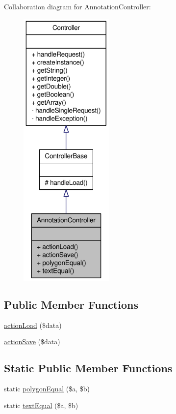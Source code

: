 Collaboration diagram for AnnotationController:\nopagebreak
\begin{figure}[H]
\begin{center}
\leavevmode
\includegraphics[height=400pt]{classAnnotationController__coll__graph}
\end{center}
\end{figure}
\subsection*{Public Member Functions}
\begin{DoxyCompactItemize}
\item 
\hyperlink{classAnnotationController_a228bd6bdd25685e7f87732eb18acb746}{actionLoad} (\$data)
\item 
\hyperlink{classAnnotationController_a94966419fbc178f74f0e6570c62af1a2}{actionSave} (\$data)
\end{DoxyCompactItemize}
\subsection*{Static Public Member Functions}
\begin{DoxyCompactItemize}
\item 
static \hyperlink{classAnnotationController_aa01689fab994eafd254c12e1d3b7d168}{polygonEqual} (\$a, \$b)
\item 
static \hyperlink{classAnnotationController_a86c36225b9d315793d11c95d21664b31}{textEqual} (\$a, \$b)
\end{DoxyCompactItemize}


